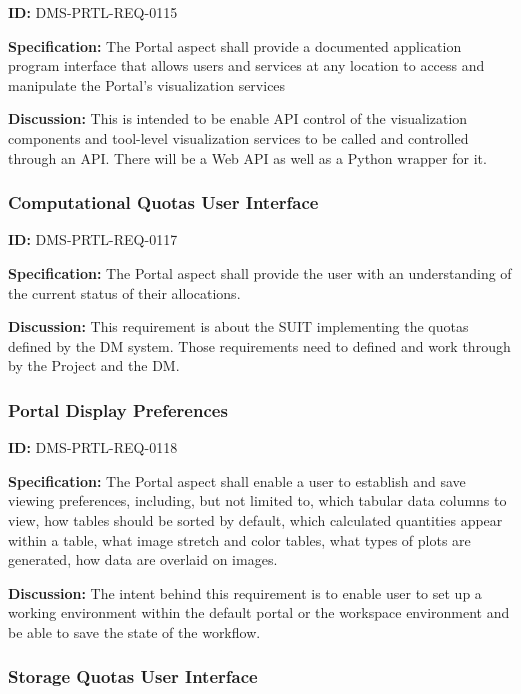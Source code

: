 \documentclass[SE,toc,lsstdraft]{lsstdoc}
\begin{document}
\label{DMS-PRTL-REQ-0115}
\textbf{ID:} DMS-PRTL-REQ-0115

\textbf{Specification:}
The Portal aspect shall provide a documented application program interface that allows users and services at any location to access and manipulate the Portal's visualization services

\textbf{Discussion:}
This is intended to be enable API control of the visualization components and tool-level visualization services to be called and controlled through an API.
There will be a Web API as well as a Python wrapper for it.

\subsubsection{Computational Quotas User Interface}

\label{DMS-PRTL-REQ-0117}
\textbf{ID:} DMS-PRTL-REQ-0117

\textbf{Specification:}
The Portal aspect shall provide the user with an understanding of the current status of their allocations.

\textbf{Discussion:}
This requirement is about the SUIT implementing the quotas defined by the DM system.  Those requirements need to defined and work through by the Project and the DM.

\subsubsection{Portal Display Preferences}

\label{DMS-PRTL-REQ-0118}
\textbf{ID:} DMS-PRTL-REQ-0118

\textbf{Specification:}
The Portal aspect shall enable a user to establish and save viewing preferences, including, but not limited to, which tabular data columns to view, how tables should be sorted by default, which calculated quantities appear within a table, what image stretch and color tables, what types of plots are generated, how data are overlaid on images.

\textbf{Discussion:}
The intent behind this requirement is to enable user to set up a working environment within the default portal or the workspace environment and be able to save the state of the workflow.

\subsubsection{Storage Quotas User Interface}
\end{document}
